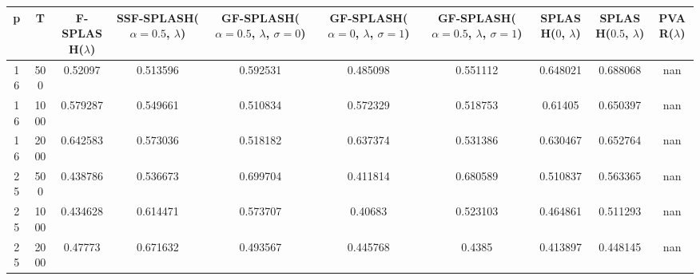 \begin{tabular}{cccccccccc}
\hline
  p  &  T   &  F-SPLASH($\lambda$)  &  SSF-SPLASH($\alpha=0.5$, $\lambda$)  &  GF-SPLASH($\alpha=0.5$, $\lambda$, $\sigma=0$)  &  GF-SPLASH($\alpha=0$, $\lambda$, $\sigma=1$)  &  GF-SPLASH($\alpha=0.5$, $\lambda$, $\sigma=1$)  &  SPLASH($0$, $\lambda$)  &  SPLASH($0.5$, $\lambda$)  &  PVAR($\lambda$)  \\
\hline
 16  & 500  &        0.52097        &               0.513596                &                     0.592531                     &                    0.485098                    &                     0.551112                     &         0.648021         &          0.688068          &        nan        \\
 16  & 1000 &       0.579287        &               0.549661                &                     0.510834                     &                    0.572329                    &                     0.518753                     &         0.61405          &          0.650397          &        nan        \\
 16  & 2000 &       0.642583        &               0.573036                &                     0.518182                     &                    0.637374                    &                     0.531386                     &         0.630467         &          0.652764          &        nan        \\
 25  & 500  &       0.438786        &               0.536673                &                     0.699704                     &                    0.411814                    &                     0.680589                     &         0.510837         &          0.563365          &        nan        \\
 25  & 1000 &       0.434628        &               0.614471                &                     0.573707                     &                    0.40683                     &                     0.523103                     &         0.464861         &          0.511293          &        nan        \\
 25  & 2000 &        0.47773        &               0.671632                &                     0.493567                     &                    0.445768                    &                      0.4385                      &         0.413897         &          0.448145          &        nan        \\
\hline
\end{tabular}